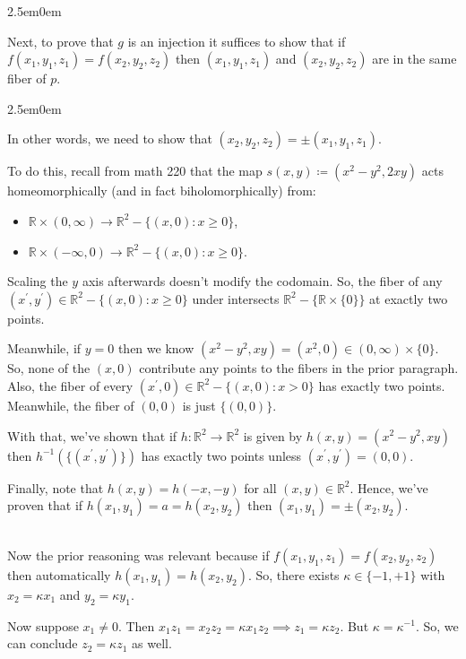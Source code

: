 \documentclass{book}
\newcommand{\HexTwoP}{%
   \color{RedViolet}%
   \fontsize{12}{13}\selectfont%
}
\newenvironment{myIndent}{%
   \begin{adjustwidth}{2.5em}{0em}%
}{%
   \end{adjustwidth}%
}
\newcommand{\mySepFour}[1][.]{%
   {\noindent\color{#1}{\rule{5.5in}{0.12mm}}}\\%
}
\newcommand{\retTwo}{\hfill\bigbreak}
\begin{document}
\begin{enumerate}
\begin{myIndent}
		Next, to prove that $g$ is an injection it suffices to show that if $f(x_1, y_1, z_1) = f(x_2, y_2, z_2)$ then $(x_1, y_1, z_1)$ and $(x_2, y_2, z_2)$ are in the same fiber of $p$.
		\begin{myIndent}\HexTwoP
			In other words, we need to show that $(x_2, y_2, z_2) = \pm(x_1, y_1, z_1)$.\retTwo

			To do this, recall from math 220 that the map $s(x, y) \coloneqq (x^2 - y^2, 2xy)$ acts homeomorphically (and in fact biholomorphically) from:
			\begin{itemize}
				\item $\mathbb{R} \times (0, \infty) \to \mathbb{R}^2 - \{(x, 0) : x \geq 0\}$,
				\item $\mathbb{R} \times (-\infty, 0) \to \mathbb{R}^2 - \{(x, 0) : x \geq 0\}$.\retTwo
			\end{itemize}

			Scaling the $y$ axis afterwards doesn't modify the codomain. So, the fiber of any $(x^\prime, y^\prime) \in \mathbb{R}^2 - \{(x, 0) : x \geq 0\}$ under intersects $\mathbb{R}^2 - \{\mathbb{R} \times \{0\}\}$ at exactly two points.\retTwo

			Meanwhile, if $y = 0$ then we know $(x^2 - y^2, xy) = (x^2, 0) \in (0, \infty) \times \{0\}$. So, none of the $(x, 0)$ contribute any points to the fibers in the prior paragraph. Also, the fiber of every $(x^\prime, 0) \in \mathbb{R}^2 - \{(x, 0) : x > 0\}$ has exactly two points. Meanwhile, the fiber of $(0, 0)$ is just $\{(0, 0)\}$.\retTwo

			With that, we've shown that if $h: \mathbb{R}^2 \to \mathbb{R}^2$ is given by $h(x, y) = (x^2 - y^2, xy)$ then $h^{-1}(\{(x^\prime, y^\prime)\})$ has exactly two points unless $(x^\prime, y^\prime) = (0, 0)$.\retTwo

			Finally, note that $h(x, y) = h(-x, -y)$ for all $(x, y) \in \mathbb{R}^2$. Hence, we've proven that if $h(x_1, y_1) = a = h(x_2, y_2)$ then $(x_1, y_1) = \pm (x_2, y_2)$.

			\mySepFour

			Now the prior reasoning was relevant because if $f(x_1, y_1, z_1) = f(x_2, y_2, z_2)$ then automatically $h(x_1, y_1) = h(x_2, y_2)$. So,  there exists $\kappa \in \{-1, +1\}$ with $x_2 = \kappa x_1$ and $y_2 = \kappa y_1$.\retTwo

			Now suppose $x_1 \neq 0$. Then $x_1 z_1 = x_2 z_2 = \kappa x_1 z_2 \implies z_1 = \kappa z_2$. But $\kappa = \kappa^{-1}$. So, we can conclude $z_2 = \kappa z_1$ as well.\retTwo


\end{myIndent}
\end{myIndent}
\end{enumerate}
\end{document}
